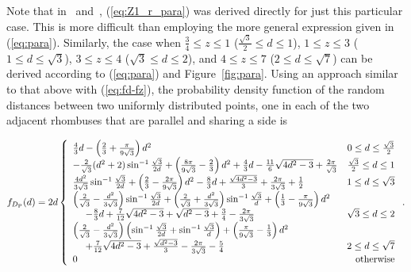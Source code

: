 \documentclass[12pt,draftclsnofoot,onecolumn]{IEEEtran}
\begin{document}
Note that in~\cite{zhuang2011random}
and~\cite{zhuang2012geometrical}, (\ref{eq:Z1_r_para}) was derived directly for just this particular case.
This is more difficult than employing the more general expression given in (\ref{eq:para}).
Similarly, the case when $\frac{3}{4} \leq z \leq 1$ ($\frac{\sqrt{3}}{2}\leq 
d\leq 1$), $1 \leq z \leq 3$ ($1\leq d\leq \sqrt{3}$), $3 \leq z \leq 4$ ($\sqrt{3}\leq 
d\leq 2$), and $4 \leq z \leq 7$ ($2\leq d\leq \sqrt{7}$) can
be derived according to (\ref{eq:para}) and Figure~\ref{fig:para}. 
Using an approach similar to that above with (\ref{eq:fd-fz}), the probability density
function of the random distances between two uniformly distributed points, one
in each of the two adjacent rhombuses that are parallel and sharing a side is
\begin{small}
 \begin{equation}\label{eq:fd_r_para}
  f_{D_{\rm P}}(d)=2d\left\{
    \begin{array}{lr}

\frac{4}{3}d-\left(\frac{2}{3}+\frac{\pi}{9\sqrt{3}}\right)d^2 & 0\leq d\leq
\frac{\sqrt{3}}{2}\\

-\frac{2}{\sqrt{3}}(d^2+2)\sin^{-1}\frac{\sqrt{3}}{2d}+\left(\frac{8\pi}
{9\sqrt{3}}-\frac{2}{3}\right)d^2+\frac{4}{3}d-\frac{11}{6}\sqrt{4d^2-3}+\frac{
2\pi}{\sqrt{3}} & \frac{\sqrt{3}}{2}\leq d\leq 1\\

\frac{4d^2}{3\sqrt{3}}\sin^{-1}\frac{\sqrt{3}}{2d}+\left(\frac{2}{3}
-\frac{2\pi}{9\sqrt{3}}\right)d^2-\frac{8}{3}d+\frac{\sqrt{4d^2-3}}{3}+\frac{
2\pi}{3\sqrt{3}}+\frac{1}{2} & 1\leq d\leq \sqrt{3} \\

\left(\frac{2}{\sqrt{3}}-\frac{d^2}{3\sqrt{3}}\right)\sin^{-1}\frac{\sqrt
{3}}{2d}+\left(\frac{2}{\sqrt{3}}+\frac{d^2}{3\sqrt{3}}\right)\sin^{-1}\frac{
\sqrt{3}}{d}+\left(\frac{1}{3}-\frac{\pi}{9\sqrt{3}}\right)d^2 \\
~~~~-\frac{8}{3}d+\frac{7}{12}\sqrt{4d^2-3}+\sqrt{d^2-3}+\frac{3}{4}
-\frac{2\pi}{3\sqrt{3}} & \sqrt{3}\leq d\leq 2 \\

\left(\frac{2}{\sqrt{3}}-\frac{d^2}{3\sqrt{3}}\right)\left(\sin^{-1}\frac{
\sqrt{3}}{2d}+\sin^{-1}\frac{\sqrt{3}}{d}\right)+\left(\frac{\pi}{9\sqrt{3}}
-\frac{1}{3 }\right)d^2 \\
~~~~+\frac{7}{12}\sqrt{4d^2-3}+\frac{\sqrt{d^2-3}}{3}-\frac{2\pi}{3\sqrt{3}}
-\frac{5}{4} & 2 \leq d \leq \sqrt{7} \\

      0 & {\rm otherwise}
    \end{array}
 \right..
\end{equation}
\end{small}
\end{document}
